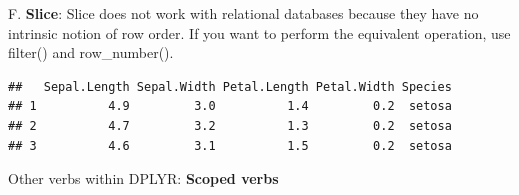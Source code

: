 \documentclass[]{book}
\newenvironment{Shaded}{\begin{snugshade}}{\end{snugshade}}
\newcommand{\DataTypeTok}[1]{\textcolor[rgb]{0.13,0.29,0.53}{#1}}
\newcommand{\DecValTok}[1]{\textcolor[rgb]{0.00,0.00,0.81}{#1}}
\newcommand{\KeywordTok}[1]{\textcolor[rgb]{0.13,0.29,0.53}{\textbf{#1}}}
\newcommand{\NormalTok}[1]{#1}
\newcommand{\OperatorTok}[1]{\textcolor[rgb]{0.81,0.36,0.00}{\textbf{#1}}}
\newcommand{\StringTok}[1]{\textcolor[rgb]{0.31,0.60,0.02}{#1}}
\begin{document}
\begin{Shaded}
\end{Shaded}

F. \textbf{Slice}: Slice does not work with relational databases because they have no intrinsic notion of row order. If you want to perform the equivalent operation, use filter() and row\_number().

\begin{Shaded}
\end{Shaded}

\begin{verbatim}
##   Sepal.Length Sepal.Width Petal.Length Petal.Width Species
## 1          4.9         3.0          1.4         0.2  setosa
## 2          4.7         3.2          1.3         0.2  setosa
## 3          4.6         3.1          1.5         0.2  setosa
\end{verbatim}

Other verbs within DPLYR: \textbf{Scoped verbs}
\end{document}
